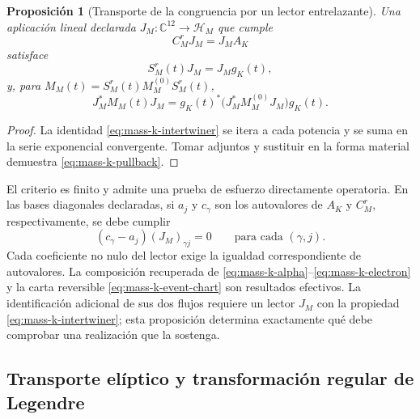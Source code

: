 \documentclass[a4paper,10pt]{article}
\newtheorem{proposition}[theorem]{Proposición}
\theoremstyle{definition}\newtheorem{definition}[theorem]{Definición}
\theoremstyle{remark}\newtheorem{remark}[theorem]{Observación}
\numberwithin{equation}{section}
\begin{document}
\begin{proposition}[Transporte de la congruencia por un lector entrelazante]
Una aplicación lineal declarada
\(J_M:\mathbb C^{12}\to\mathscr H_M\) que cumple
\begin{equation}
 C_M^rJ_M=J_MA_K
 \label{eq:mass-k-intertwiner}
\end{equation}
satisface
\[
 S_M^r(t)J_M=J_Mg_K(t),
\]
y, para \(M_M(t)=S_M^r(t)M_M^{(0)}S_M^r(t)\),
\begin{equation}
 J_M^*M_M(t)J_M
 =g_K(t)^*\bigl(J_M^*M_M^{(0)}J_M\bigr)g_K(t).
 \label{eq:mass-k-pullback}
\end{equation}
\end{proposition}
\begin{proof}
La identidad \eqref{eq:mass-k-intertwiner} se itera a cada potencia
y se suma en la serie exponencial convergente. Tomar adjuntos y
sustituir en la forma material demuestra
\eqref{eq:mass-k-pullback}.
\end{proof}

El criterio es finito y admite una prueba de esfuerzo directamente
operatoria. En las bases diagonales declaradas, si \(a_j\) y
\(c_\gamma\) son los autovalores de \(A_K\) y \(C_M^r\),
respectivamente, se debe cumplir
\[
 (c_\gamma-a_j)(J_M)_{\gamma j}=0
 \qquad\text{para cada }(\gamma,j).
\]
Cada coeficiente no nulo del lector exige la igualdad correspondiente
de autovalores. La composición recuperada de
\eqref{eq:mass-k-alpha}--\eqref{eq:mass-k-electron} y la carta reversible
\eqref{eq:mass-k-event-chart} son resultados efectivos. La identificación
adicional de sus dos flujos requiere un lector \(J_M\) con la propiedad
\eqref{eq:mass-k-intertwiner}; esta proposición determina exactamente
qué debe comprobar una realización que la sostenga.

\subsection{Transporte elíptico y transformación regular de Legendre}
\end{document}
